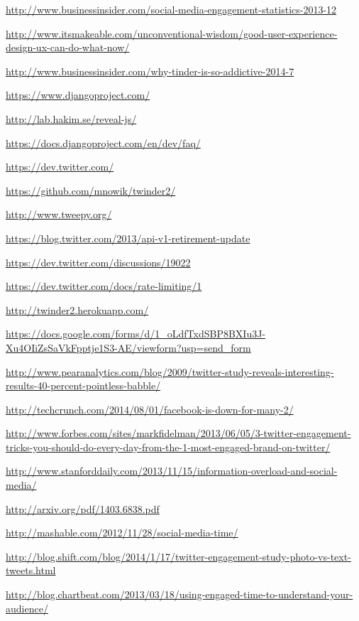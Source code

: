 \begin{thebibliography}{9}
\url{http://www.businessinsider.com/social-media-engagement-statistics-2013-12}


\url{http://www.itsmakeable.com/unconventional-wisdom/good-user-experience-design-ux-can-do-what-now/}

\url{http://www.businessinsider.com/why-tinder-is-so-addictive-2014-7}


\url{https://www.djangoproject.com/}

\url{http://lab.hakim.se/reveal-js/}

\url{https://docs.djangoproject.com/en/dev/faq/}

\url{https://dev.twitter.com/}

\url{https://github.com/mnowik/twinder2/}

\url{http://www.tweepy.org/}

\url{https://blog.twitter.com/2013/api-v1-retirement-update}

\url{https://dev.twitter.com/discussions/19022}

\url{https://dev.twitter.com/docs/rate-limiting/1}

\url{http://twinder2.herokuapp.com/}

\url{https://docs.google.com/forms/d/1_oLdfTxdSBP8BXIu3J-Xu4OIiZsSaVkFpptje1S3-AE/viewform?usp=send_form}



\url{http://www.pearanalytics.com/blog/2009/twitter-study-reveals-interesting-results-40-percent-pointless-babble/}

\url{http://techcrunch.com/2014/08/01/facebook-is-down-for-many-2/}

\url{http://www.forbes.com/sites/markfidelman/2013/06/05/3-twitter-engagement-tricks-you-should-do-every-day-from-the-1-most-engaged-brand-on-twitter/}

\url{http://www.stanforddaily.com/2013/11/15/information-overload-and-social-media/}

\url{http://arxiv.org/pdf/1403.6838.pdf}

\url{http://mashable.com/2012/11/28/social-media-time/}

\url{http://blog.shift.com/blog/2014/1/17/twitter-engagement-study-photo-vs-text-tweets.html}

\url{http://blog.chartbeat.com/2013/03/18/using-engaged-time-to-understand-your-audience/}
  
\end{thebibliography}


